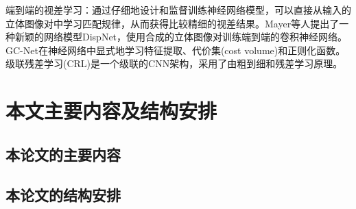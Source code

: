 端到端的视差学习：通过仔细地设计和监督训练神经网络模型，可以直接从输入的立体图像对中学习匹配规律，从而获得比较精细的视差结果。Mayer\cite{mayer2016large}等人提出了一种新颖的网络模型DispNet，使用合成的立体图像对训练端到端的卷积神经网络。GC-Net\cite{kendall2017end}在神经网络中显式地学习特征提取、代价集(cost volume)和正则化函数。级联残差学习(CRL)\cite{pang2017cascade}是一个级联的CNN架构，采用了由粗到细和残差学习原理。


\section{本文主要内容及结构安排}
\subsection{本论文的主要内容}

\subsection{本论文的结构安排}












